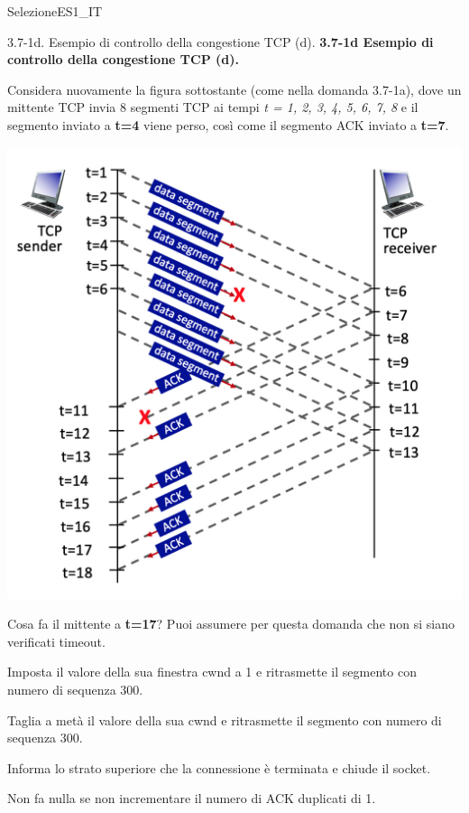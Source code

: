 \documentclass[a4paper]{article}
\begin{document}
\begin{quiz}{SelezioneES1\_IT}
\begin{multi}[points=1,shuffle]{3.7-1d. Esempio di controllo della congestione TCP (d).}
\textbf{3.7-1d Esempio di controllo della congestione TCP (d).}

Considera nuovamente la figura sottostante (come nella domanda 3.7-1a), dove un mittente TCP invia 8 segmenti TCP ai tempi \emph{t = 1, 2, 3, 4, 5, 6, 7, 8} e il segmento inviato a \textbf{t=4} viene perso, così come il segmento ACK inviato a \textbf{t=7}.

\begin{center}
	\includegraphics[width=\linewidth]{figs/tcp_seq_ack_1.jpg}
\end{center}

Cosa fa il mittente a \textbf{t=17}? Puoi assumere per questa domanda che non si siano verificati timeout.
\item Imposta il valore della sua finestra cwnd a 1 e ritrasmette il segmento con numero di sequenza 300.
\item* Taglia a metà il valore della sua cwnd e ritrasmette il segmento con numero di sequenza 300.
\item Informa lo strato superiore che la connessione è terminata e chiude il socket.
\item Non fa nulla se non incrementare il numero di ACK duplicati di 1.
\end{multi}


\end{quiz}
\end{document}
